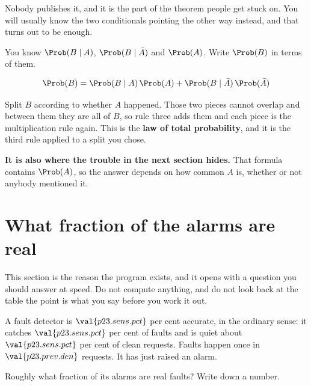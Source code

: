 \begin{fr}

Nobody publishes it, and it is the part of the theorem people get stuck on. You
will usually know the two conditionals pointing the other way instead, and that
turns out to be enough.

You know $\Prob(B \mid A)$, $\Prob(B \mid \bar{A})$ and $\Prob(A)$. Write
$\Prob(B)$ in terms of them.
\dotline
\nextframe
\end{fr}

\begin{fr}
\begin{ansblock}
\[ \Prob(B) = \Prob(B \mid A)\,\Prob(A)
            + \Prob(B \mid \bar{A})\,\Prob(\bar{A}) \]
\end{ansblock}

Split $B$ according to whether $A$ happened. Those two pieces cannot overlap
and between them they are all of $B$, so rule three adds them \dash{} and each
piece is the multiplication rule again. This is the \textbf{law of total
probability}, and it is the third rule applied to a split you chose.

\textbf{It is also where the trouble in the next section hides.} That formula
contains $\Prob(A)$, so the answer depends on how common $A$ is, whether or not
anybody mentioned it.
\end{fr}

\section{What fraction of the alarms are real}
\label{sec:P23-baserate}

\begin{fr}
This section is the reason the program exists, and it opens with a question you
should answer at speed. Do not compute anything, and do not look back at the
table \dash{} the point is what you say before you work it out.

A fault detector is $\val{p23.sens.pct}$ per cent accurate, in the ordinary
sense: it catches $\val{p23.sens.pct}$ per cent of faults and is quiet about
$\val{p23.sens.pct}$ per cent of clean requests. Faults happen once in
$\val{p23.prev.den}$ requests. It has just raised an alarm.

Roughly what fraction of its alarms are real faults? Write down a number.
\dotline
\nextframe
\end{fr}

